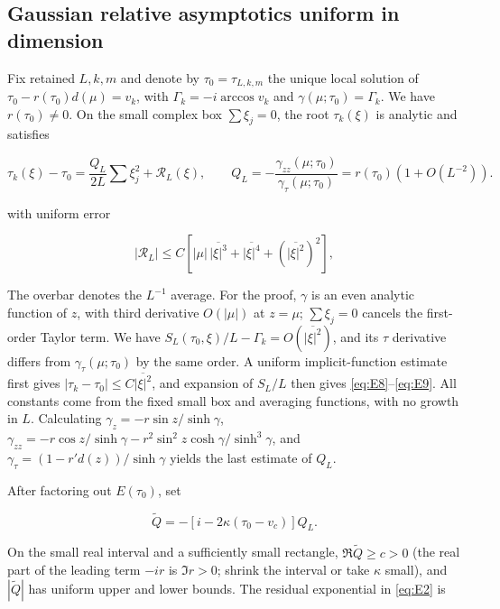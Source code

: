 \documentclass[11pt,a4paper]{article}
\numberwithin{equation}{section}
\theoremstyle{plain}
\theoremstyle{definition}
\begin{document}
\subsection{Gaussian relative asymptotics uniform in dimension}\label{sec:highdim}

Fix retained \(L,k,m\) and denote by \(\tau_0=\tau_{L,k,m}\) the unique local solution of \(\tau_0-r(\tau_0)d(\mu)=v_k\), with \(\Gamma_k=-i\arccos v_k\) and \(\gamma(\mu;\tau_0)=\Gamma_k\). We have \(r(\tau_0)\ne0\). On the small complex box \(\sum\xi_j=0\), the root \(\tau_k(\xi)\) is analytic and satisfies

\begin{equation}
\tau_k(\xi)-\tau_0=\frac{Q_L}{2L}\sum\xi_j^2+\mathcal R_L(\xi),\qquad Q_L=-\frac{\gamma_{zz}(\mu;\tau_0)}{\gamma_\tau(\mu;\tau_0)}=r(\tau_0)(1+O(L^{-2})).
\label{eq:E8}
\end{equation}

with uniform error

\begin{equation}
|\mathcal R_L|\le C\left[|\mu|\,\overline{|\xi|^3}+\overline{|\xi|^4}+(\overline{|\xi|^2})^2\right],
\label{eq:E9}
\end{equation}

The overbar denotes the \(L^{-1}\) average. For the proof, \(\gamma\) is an even analytic function of \(z\), with third derivative \(O(|\mu|)\) at \(z=\mu\); \(\sum\xi_j=0\) cancels the first-order Taylor term. We have \(S_L(\tau_0,\xi)/L-\Gamma_k=O(\overline{|\xi|^2})\), and its \(\tau\) derivative differs from \(\gamma_\tau(\mu;\tau_0)\) by the same order. A uniform implicit-function estimate first gives \(|\tau_k-\tau_0|\le C\overline{|\xi|^2}\), and expansion of \(S_L/L\) then gives \eqref{eq:E8}--\eqref{eq:E9}. All constants come from the fixed small box and averaging functions, with no growth in \(L\). Calculating \(\gamma_z=-r\sin z/\sinh\gamma\), \(\gamma_{zz}=-r\cos z/\sinh\gamma-r^2\sin^2 z\cosh\gamma/\sinh^3\gamma\), and \(\gamma_\tau=(1-r'd(z))/\sinh\gamma\) yields the last estimate of \(Q_L\).

After factoring out \(E(\tau_0)\), set

\[\widetilde Q=-[i-2\kappa(\tau_0-v_c)]Q_L.\]

On the small real interval and a sufficiently small rectangle, \(\Re\widetilde Q\ge c>0\) (the real part of the leading term \(-ir\) is \(\Im r>0\); shrink the interval or take \(\kappa\) small), and \(|\widetilde Q|\) has uniform upper and lower bounds. The residual exponential in \eqref{eq:E2} is
\end{document}
